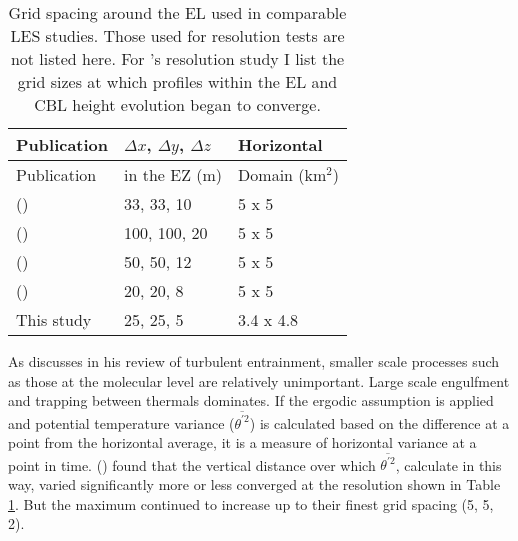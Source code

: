 \begin{table}[htbp]
\caption[]{Grid spacing around the \acs{EL} used in comparable \acs{LES} studies. Those used for resolution tests are not listed here.  For \citeauthor{SullPat}'s \citeyear{SullPat} resolution study I list the grid sizes at which profiles within the \acs{EL} and \acs{CBL} height evolution began to converge.}

    \begin{center}
    \begin{tabular}{ p{5cm} p{3cm} p{3cm}}
Publication & $\Delta x$, $\Delta y$, $\Delta z$ & Horizontal \\ \hline
Publication & in the \acs{EZ} (m)& Domain (km$^{2}$) \\ \hline
      \citeauthor{SullMoengStev} (\citeyear{SullMoengStev}) & 33, 33, 10 & 5 x 5 \\ %
      \citeauthor{FedConzMir04} (\citeyear{FedConzMir04}) & 100, 100, 20 & 5 x 5 \\ [.3cm] %
      \citeauthor{BrooksFowler2} (\citeyear{BrooksFowler2}) & 50, 50, 12 & 5 x 5 \\%
      \citeauthor{SullPat} (\citeyear{SullPat}) &  20, 20, 8 & 5 x 5\\ %
      This study & 25, 25, 5 &  3.4 x 4.8\\ \hline       
    \end{tabular}
\label{table:gridcomp}   
\end{center}    
\end{table}


As \citeauthor{Turner86} discusses in his \citeyear{Turner86} review of turbulent entrainment, smaller scale processes such as those at the molecular level are relatively unimportant.  Large scale engulfment and trapping between thermals dominates.  If the ergodic assumption is applied and potential temperature variance ($\overline{\theta^{'2}}$) is calculated based on the difference at a point from the horizontal average, it is a measure of horizontal variance at a point in time.  \citeauthor{SullPat} (\citeyear{SullPat}) found that the vertical distance over which $\overline{\theta^{'2}}$, calculate in this way, varied significantly more or less converged at the resolution shown in Table \ref{table:gridcomp}.  But the maximum continued to increase up to their finest grid spacing (5, 5, 2).\\

